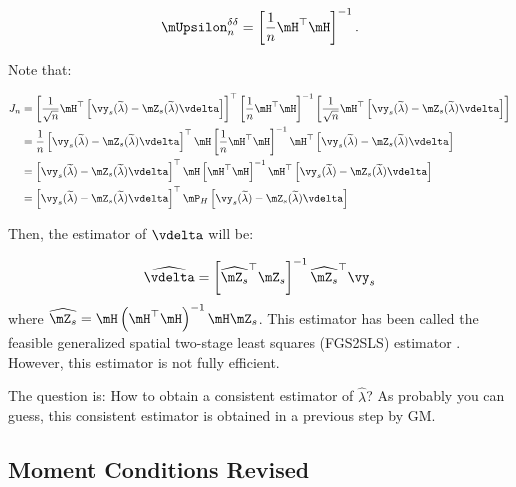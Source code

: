 \documentclass[english,12pt]{book}\usepackage[]{graphicx}\usepackage[]{xcolor}
\begin{document}
\begin{equation*}
\mUpsilon^{\delta\delta}_n = \left[\frac{1}{n}\mH^\top\mH\right]^{-1}.
\end{equation*}

Note that:

\begin{equation*}
  \begin{aligned}
 J_n & = \left[\frac{1}{\sqrt{n}}\mH^\top\left[\vy_s(\widetilde{\lambda}) - \mZ_s(\widetilde{\lambda})\vdelta\right]\right]^\top \left[\frac{1}{n}\mH^\top\mH\right]^{-1}\left[\frac{1}{\sqrt{n}}\mH^\top\left[\vy_s(\widetilde{\lambda}) - \mZ_s(\widetilde{\lambda})\vdelta\right]\right] \\
     & = \frac{1}{n}\left[\vy_s(\widetilde{\lambda}) - \mZ_s(\widetilde{\lambda})\vdelta\right]^\top \mH \left[\frac{1}{n}\mH^\top\mH\right]^{-1}\mH^\top \left[\vy_s(\widetilde{\lambda}) - \mZ_s(\widetilde{\lambda})\vdelta\right] \\
     & = \left[\vy_s(\widetilde{\lambda}) - \mZ_s(\widetilde{\lambda})\vdelta\right]^\top \mH \left[\mH^\top\mH\right]^{-1}\mH^\top \left[\vy_s(\widetilde{\lambda}) - \mZ_s(\widetilde{\lambda})\vdelta\right] \\
     & = \left[\vy_s(\widetilde{\lambda}) - \mZ_s(\widetilde{\lambda})\vdelta\right]^\top \mP_H \left[\vy_s(\widetilde{\lambda}) - \mZ_s(\widetilde{\lambda})\vdelta\right]
\end{aligned}
\end{equation*}

Then, the estimator of $\vdelta$ will be:

\begin{equation*}
  \widehat{\vdelta} = \left[\widehat{\mZ_s}^\top\mZ_s\right]^{-1}\widehat{\mZ_s}^\top\vy_s
\end{equation*}
%
where $\widehat{\mZ_s} = \mH\left(\mH^\top\mH\right)^{-1}\mH\mZ_s$. This estimator has been called the feasible generalized spatial two-stage least squares (FGS2SLS) estimator \citep{kelejian1998generalized}. However, this estimator is not fully efficient. 


The question is: How to obtain a consistent estimator of $\widehat{\lambda}$? As probably you can guess, this consistent estimator is obtained in a previous step by GM. 


\subsection{Moment Conditions Revised}
\end{document}
